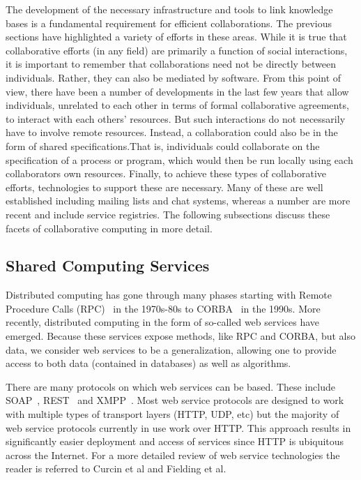 \documentclass[11pt]{book}
\begin{document}
The development of the necessary infrastructure and tools to link knowledge bases is
a fundamental requirement for efficient collaborations. The previous
sections have highlighted a variety of efforts in these areas. While
it is true that collaborative efforts (in any field) are primarily a
function of social interactions, it is important to remember that
collaborations need not be directly between individuals. Rather, they
can also be mediated by software. From this point of view, there have
been a number of developments in the last few years that allow
individuals, unrelated to each other in terms of formal collaborative
agreements, to interact with each others' resources. But such
interactions do not necessarily have to involve remote
resources. Instead, a collaboration could also be in the form of
shared specifications.That is, individuals could collaborate on the
specification of a process or program, which would then be run locally
using each collaborators own resources. Finally, to achieve these
types of collaborative efforts, technologies to support these are
necessary. Many of these are well established including mailing lists
and chat systems, whereas a number are more recent and include service
registries. The following subsections discuss these facets of
collaborative computing in more detail.

\subsection{Shared Computing Services}
\label{ref:ws}

Distributed computing has gone through many phases starting with
Remote Procedure Calls (RPC)~\cite{rfc707} in the 1970s-80s to
CORBA~\cite{url:corba1.0} in the
1990s. More recently, distributed computing in the form of so-called
web services have emerged. Because these services expose methods,
like RPC and CORBA, but also data, we consider web
services to be a generalization, allowing one to provide access to
both data (contained in databases) as well as algorithms.

There are many protocols on which web services can be based.
These include SOAP~\cite{Gudgin:07:SVP},
REST~\cite{fielding:2000} and
XMPP~\cite{Wagener2009}. Most web service protocols are designed to
work with multiple types of transport layers (HTTP, UDP, etc) but the
majority of web service protocols currently in use work over
HTTP. This approach results in significantly easier deployment and
access of services since HTTP is ubiquitous across the
Internet. For a more detailed review of web service technologies the
reader is referred to Curcin et al\cite{Curcin:2005fk} and Fielding et
al\cite{Fielding:2002eu}.
\end{document}
